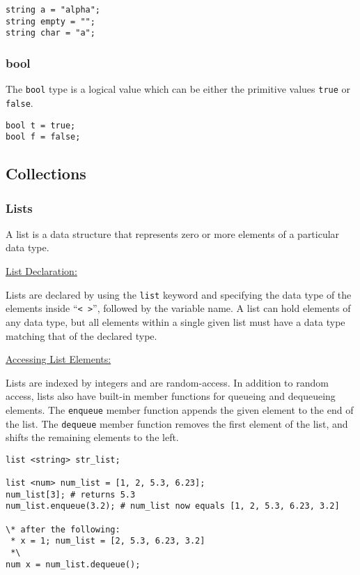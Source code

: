 \documentclass{article}
\newcommand{\code}[1]{\texttt{#1}} %
\begin{document}
\begin{lstlisting}[language=pltLang, caption=Declaration of ``string'' types., label=lst:string]
string a = "alpha";
string empty = "";
string char = "a";
\end{lstlisting}

\subsubsection{bool}

The \code{bool} type is a logical value which can be either the primitive values \code{true} or \code{false}.

\begin{lstlisting}[language=pltLang, caption=Declaration of ``bool'' types., label=lst:bool]
bool t = true;
bool f = false;
\end{lstlisting}

\subsection{Collections}

\subsubsection{Lists}

A list is a data structure that represents zero or more elements of a particular data type. 

\underline{List Declaration:}

Lists are declared by using the \code{list} keyword and specifying the data type of the elements inside ``\code{< >}'', followed by the variable name. A list can hold elements of any data type, but all elements within a single given list must have a data type matching that of the declared type. 

\underline{Accessing List Elements:}

Lists are indexed by integers and are random-access. In addition to random access, lists also have built-in member functions for queueing and dequeueing elements. The \code{enqueue} member function appends the given element to the end of the list. The \code{dequeue} member function removes the first element of the list, and shifts the remaining elements to the left. 

\begin{lstlisting}[language=pltLang, caption=The ``list'' type., label=lst:list]
list <string> str_list;

list <num> num_list = [1, 2, 5.3, 6.23];
num_list[3]; # returns 5.3
num_list.enqueue(3.2); # num_list now equals [1, 2, 5.3, 6.23, 3.2]

\* after the following:
 * x = 1; num_list = [2, 5.3, 6.23, 3.2]
 *\
num x = num_list.dequeue();
\end{lstlisting}
\end{document}
